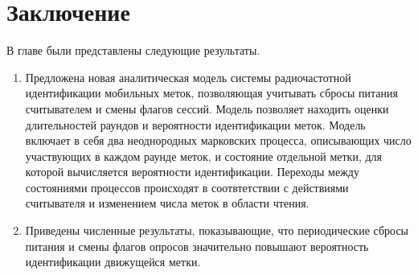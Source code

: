\section{Заключение}\label{sec:ch3_conclusion}
В главе были представлены следующие результаты.

\begin{enumerate}
\item Предложена новая аналитическая модель системы радиочастотной идентификации мобильных меток, позволяющая учитывать сбросы питания считывателем и смены флагов сессий. Модель позволяет находить оценки длительностей раундов и вероятности идентификации меток. Модель включает в себя два неоднородных марковских процесса, описывающих число участвующих в каждом раунде меток, и состояние отдельной метки, для которой вычисляется вероятности идентификации. Переходы между состояниями процессов происходят в соотвтетствии с действиями считывателя и изменением числа меток в области чтения.
\item Приведены численные результаты, показывающие, что периодические сбросы питания и смены флагов опросов значительно повышают вероятность идентификации движущейся метки.
\end{enumerate}

\clearpage
